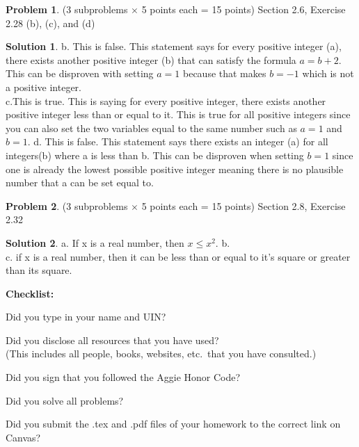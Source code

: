 \documentclass{article}
\theoremstyle{definition}
\newtheorem{problem}{Problem}
\newtheorem*{solution}{Solution}
\newcommand{\checklist}{\noindent\textbf{Checklist:}
\begin{compactitem}[$\Box$] 
\item Did you type in your name and UIN? 
\item Did you disclose all resources that you have used? \\
(This includes all people, books, websites, etc.\ that you have consulted.)
\item Did you sign that you followed the Aggie Honor Code? 
\item Did you solve all problems? 
\item Did you submit the .tex and .pdf files of your homework to the correct link on Canvas? 
\end{compactitem}
}
\begin{document}
\begin{problem} (3 subproblems $\times$ 5 points each = 15 points) Section 2.6,
Exercise 2.28 (b), (c), and (d)
\end{problem}
\begin{solution} 
b. This is false. This statement says for every positive integer (a), there exists another positive integer (b) that can satisfy the formula $a = b + 2$. This can be disproven with setting $a = 1$ because that makes $b = -1$ which is not a positive integer.\\
c.This is true. This is saying for every positive integer, there exists another positive integer less than or equal to it. This is true for all positive integers since you can also set the two variables equal to the same number such as $a = 1$ and $b = 1$.
d. This is false. This statement says there exists an integer (a) for all integers(b) where a is less than b. This can be disproven when setting $b = 1$ since one is already the lowest possible positive integer meaning there is no plausible number that a can be set equal to.
\end{solution}

\begin{problem} (3 subproblems $\times$ 5 points each = 15 points) Section 2.8,
Exercise 2.32
\end{problem}
\begin{solution} 
a. If x is a real number, then $x \leqslant x^2$.
b. \\
c. if x is a real number, then it can be less than or equal to it's square or greater than its square.

\end{solution}

\goodbreak
\checklist
\end{document}
